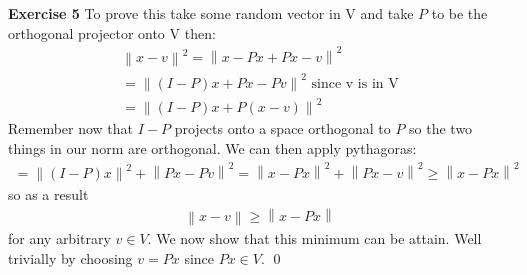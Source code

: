 \documentclass[12pt]{article}
\newcommand{\norm}[1]{\left\lVert#1\right\rVert}
\newenvironment{exercise}[1]{\vspace{.1in}\noindent\textbf{Exercise #1 \hspace{.05em}}}{}
\theoremstyle{definition}
\theoremstyle{remark}
\begin{document}
\begin{exercise}{5}
	To prove this take some random vector in V and take $P$ to be the orthogonal projector onto V then:
	\begin{align}
		\norm{x-v}^2=\norm{x-Px+Px-v}^2               \\
		=\norm{(I-P)x+Px-Pv}^2\text{ since v is in V} \\
		=\norm{(I-P)x+P(x-v)}^2
	\end{align}
	Remember now that $I-P$ projects onto a space orthogonal to $P$ so the two things in our norm are orthogonal. We can then apply pythagoras:
	\begin{align}
		=\norm{(I-P)x}^2+\norm{Px-Pv}^2
		=\norm{x-Px}^2+\norm{Px-v}^2\geq \norm{x-Px}^2
	\end{align}
	so as a result
	\begin{align}
		\norm{x-v}\geq \norm{x-Px}
	\end{align}
	for any arbitrary $v\in V$. We now show that this minimum can be attain. Well trivially by choosing $v=Px$ since $Px\in V$. \qed
\end{exercise}
\end{document}
